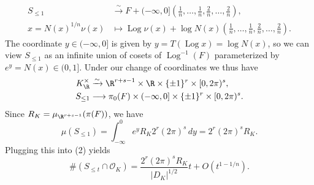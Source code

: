 \begin{align*}
S_{\leq1}&\xrightarrow{\sim}F+(-\infty,0]\left(\tfrac1n,\ldots,\tfrac1n,\tfrac2n,\ldots,\tfrac2n\right),\\
x=N(x)^{1/n}\nu(x)&\longmapsto\operatorname{Log}\nu(x)+\log N(x)\left(\tfrac1n,\ldots,\tfrac1n,\tfrac2n,\ldots,\tfrac2n\right).
\end{align*}
The coordinate $y\in(-\infty,0]$ is given by $y=T(\operatorname{Log}x)=\log N(x)$, so we can view $S_{\leq1}$ as an infinite union of cosets of $\operatorname{Log}^{-1}(F)$ parameterized by $e^y=N(x)\in(0,1]$. Under our change of coordinates we thus have
\[
\begin{aligned}
K_\R^\times&\xrightarrow{\sim}\R^{r+s-1}\times\R\times\{\pm1\}^r\times[0,2\pi)^s,\\
S_{\leq1}&\longrightarrow\pi_0(F)\times(-\infty,0]\times\{\pm1\}^r\times[0,2\pi)^s.
\end{aligned}
\]
Since $R_K=\mu_{\R^{r+s-1}}(\pi(F))$, we have
\[
\mu(S_{\leq1})=\int_{-\infty}^0 e^y R_K2^r(2\pi)^s\,dy=2^r(2\pi)^sR_K.
\]
Plugging this into (2) yields
\[
\#(S_{\leq t}\cap\mathcal O_K)=\frac{2^r(2\pi)^sR_K}{|D_K|^{1/2}}t+O(t^{1-1/n}).\tag{3}
\]
